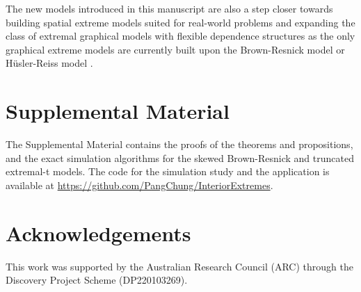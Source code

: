\documentclass[12pt]{article}
\begin{document}

The new models introduced in this manuscript are also a step closer towards building spatial extreme models suited for real-world problems and expanding the class of extremal graphical models with flexible dependence structures as the only graphical extreme models are currently built upon the Brown-Resnick model or H\"usler-Reiss model \citep{Engelke.Hitz:2020,Hentschel.Engelke.Segers:2024,Wan.Zhou:2023}. 

\section*{Supplemental Material}

The Supplemental Material contains the proofs of the theorems and propositions, and the exact simulation algorithms for the skewed Brown-Resnick and truncated extremal-t models. The code for the simulation study and the application is available at \url{https://github.com/PangChung/InteriorExtremes}. 

\section*{Acknowledgements}

This work was supported by the Australian Research Council (ARC) through the Discovery Project Scheme (DP220103269). 

\baselineskip=18pt


\end{document}

